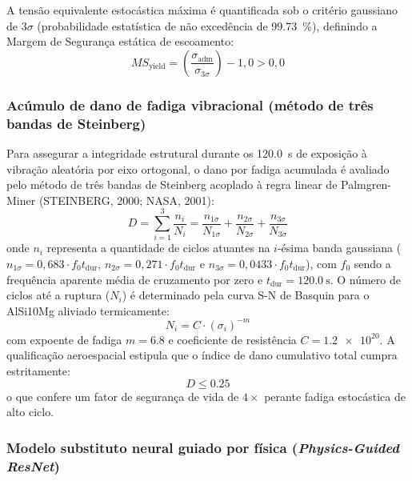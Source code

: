 A tensão equivalente estocástica máxima é quantificada sob o critério gaussiano de $3\sigma$ (probabilidade estatística de não excedência de \SI{99.73}{\percent}), definindo a Margem de Segurança estática de escoamento:
\begin{equation}
  MS_{\text{yield}} = \left( \frac{\sigma_{\text{adm}}}{\sigma_{3\sigma}} \right) - 1{,}0 > 0{,}0
  \label{eq:ms}
\end{equation}

\subsubsection{Acúmulo de dano de fadiga vibracional (método de três bandas de Steinberg)}
\label{subsubsec:steinberg}

Para assegurar a integridade estrutural durante os \SI{120.0}{\second} de exposição à vibração aleatória por eixo ortogonal, o dano por fadiga acumulada é avaliado pelo método de três bandas de Steinberg acoplado à regra linear de Palmgren-Miner (STEINBERG, 2000; NASA, 2001):
\begin{equation}
  D = \sum_{i=1}^{3} \frac{n_i}{N_i} = \frac{n_{1\sigma}}{N_{1\sigma}} + \frac{n_{2\sigma}}{N_{2\sigma}} + \frac{n_{3\sigma}}{N_{3\sigma}}
  \label{eq:miner}
\end{equation}
onde $n_i$ representa a quantidade de ciclos atuantes na $i$-ésima banda gaussiana ($n_{1\sigma} = 0{,}683 \cdot f_0 t_{\text{dur}}$, $n_{2\sigma} = 0{,}271 \cdot f_0 t_{\text{dur}}$ e $n_{3\sigma} = 0{,}0433 \cdot f_0 t_{\text{dur}}$), com $f_0$ sendo a frequência aparente média de cruzamento por zero e $t_{\text{dur}} = \SI{120.0}{\second}$. O número de ciclos até a ruptura ($N_i$) é determinado pela curva S-N de Basquin para o AlSi10Mg aliviado termicamente:
\begin{equation}
  N_i = C \cdot \left(\sigma_i\right)^{-m}
  \label{eq:basquin}
\end{equation}
com expoente de fadiga $m = \num{6.8}$ e coeficiente de resistência $C = \num{1.2e20}$. A qualificação aeroespacial estipula que o índice de dano cumulativo total cumpra estritamente:
\begin{equation}
  D \le \num{0.25}
  \label{eq:dmax}
\end{equation}
o que confere um fator de segurança de vida de $4\times$ perante fadiga estocástica de alto ciclo.

\subsubsection{Modelo substituto neural guiado por física (\textit{Physics-Guided ResNet})}
\label{subsubsec:resnet}

